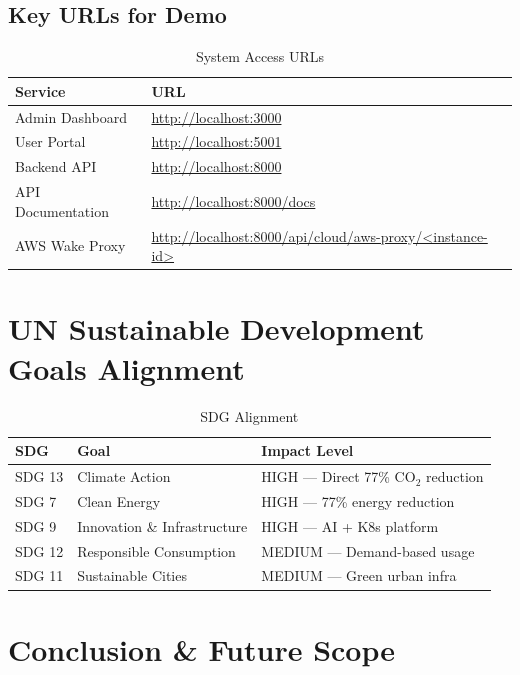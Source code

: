 \documentclass[12pt,a4paper]{report}
\begin{document}
\section{Key URLs for Demo}

\begin{table}[H]
\centering
\caption{System Access URLs}
\begin{tabular}{@{}ll@{}}
\toprule
\textbf{Service} & \textbf{URL} \\
\midrule
Admin Dashboard & \url{http://localhost:3000} \\
User Portal & \url{http://localhost:5001} \\
Backend API & \url{http://localhost:8000} \\
API Documentation & \url{http://localhost:8000/docs} \\
AWS Wake Proxy & \url{http://localhost:8000/api/cloud/aws-proxy/<instance-id>} \\
\bottomrule
\end{tabular}
\end{table}

\chapter{UN Sustainable Development Goals Alignment}

\begin{table}[H]
\centering
\caption{SDG Alignment}
\begin{tabular}{@{}lll@{}}
\toprule
\textbf{SDG} & \textbf{Goal} & \textbf{Impact Level} \\
\midrule
SDG 13 & Climate Action & HIGH --- Direct 77\% CO$_2$ reduction \\
SDG 7 & Clean Energy & HIGH --- 77\% energy reduction \\
SDG 9 & Innovation \& Infrastructure & HIGH --- AI + K8s platform \\
SDG 12 & Responsible Consumption & MEDIUM --- Demand-based usage \\
SDG 11 & Sustainable Cities & MEDIUM --- Green urban infra \\
\bottomrule
\end{tabular}
\end{table}

\chapter{Conclusion \& Future Scope}
\end{document}
